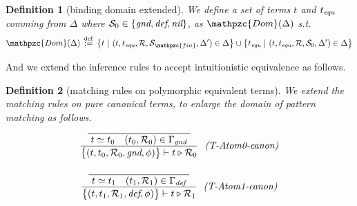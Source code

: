 \documentclass[12pt]{article}
\newtheorem{Definition}{Definition}[section]
\begin{document}
\begin{Definition}[binding domain extended]
  We define a set of terms $t$ and $t_{\text{\it equ}}$ comming from
  $\Delta$ where $\mathcal{S}_0 \in \{\text{\it gnd}, \text{\it def},
  \text{\it nil}\}$, as $\mathpzc{Dom}(\Delta)$ s.t.
  \[ \mathpzc{Dom}(\Delta) \,\stackrel{\mathrm{def}}{:=}\,
  \bigl\{ t \ |\  (t, t_{\text{\it equ}}, \mathcal{R},
  \mathcal{S}_{\mathpzc{fin}}, \Delta') \in \Delta \bigr\} \cup
  \bigl\{t_{\text{\it equ}}  \ |\  (t, t_{\text{\it equ}},
  \mathcal{R}, \mathcal{S}_0, \Delta') \in \Delta \bigr\} 
  \]
\end{Definition}


And we extend the inference rules to accept intuitionistic equivalence
as follows.

\begin{Definition}[matching rules on polymorphic equivalent terms]
  We extend the matching rules on pure canonical terms, to
  enlarge the domain of pattern matching as follows. 
  \begin{displaymath}
    \begin{array}{c}

      \begin{array}{rl}
        \dfrac{
          \dfrac{}{
            \raisebox{0.5ex}[2.3ex][0ex]{
              $t \simeq t_0
                \quad (t_0, \mathcal{R}_0) \in \Gamma_\text{\it gnd}$
            }
          }
        }{
          \bigl\{(t, t_0, \mathcal{R}_0, \text{\it gnd}, \phi ) \bigr\}
           \vdash t \triangleright \mathcal{R}_0          
        }  &  \!\! \text{\it (T-Atom0-canon)}
      \end{array}  \\
      \\
      
      \begin{array}{rl}
        \dfrac{
          \dfrac{}{
            \raisebox{0.5ex}[2.3ex][0ex]{
              $t \simeq t_1
                \quad (t_1, \mathcal{R}_1) \in \Gamma_\text{\it def}$
            }
          }
        }{
          \bigl\{(t, t_1, \mathcal{R}_1, \text{\it def}, \phi ) \bigr\}
           \vdash t \triangleright \mathcal{R}_1
        }  &  \!\! \text{\it (T-Atom1-canon)}
      \end{array}  \\
      \\
      

\end{array}
\end{displaymath}
\end{Definition}
\end{document}
